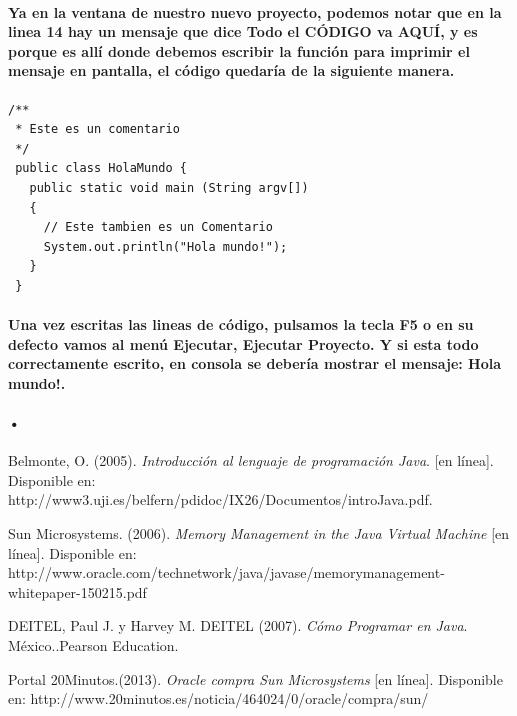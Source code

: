 \documentclass[12pt]{book} %
\begin{document}
\paragraph{Ya en la ventana de nuestro nuevo proyecto, podemos notar que en la linea 14 hay un mensaje que dice Todo el CÓDIGO va AQUÍ, y es porque es allí donde debemos escribir la función para imprimir el mensaje en pantalla, el código quedaría de la siguiente manera.}

\noindent
\noindent
%
\begin{lstlisting}[frame=single]
/**
 * Este es un comentario
 */
 public class HolaMundo {
   public static void main (String argv[])
   {
     // Este tambien es un Comentario
     System.out.println("Hola mundo!");
   }
 }
\end{lstlisting}

\paragraph{Una vez escritas las lineas de código, pulsamos la tecla F5 o en su defecto vamos al menú Ejecutar, Ejecutar Proyecto. Y si esta todo correctamente escrito, en consola se debería mostrar el mensaje: Hola mundo!.}
\paragraph{•}

\begin{thebibliography}{99}
 Belmonte, O. (2005). \textsl{Introducci\'on al lenguaje de programaci\'on Java}. [en l\'inea]. Disponible en: http://www3.uji.es/belfern/pdidoc/IX26/Documentos/introJava.pdf.

 Sun Microsystems. (2006). \textsl{Memory Management in the Java Virtual Machine} [en l\'inea]. Disponible en: http://www.oracle.com/technetwork/java/javase/memorymanagement-whitepaper-150215.pdf

\bibitem DEITEL, Paul J. y Harvey M. DEITEL (2007). \textsl{C\'omo Programar en Java}. M\'exico..Pearson Education. 

\bibitem Portal 20Minutos.(2013). \textsl{Oracle compra Sun Microsystems} [en l\'inea]. Disponible en: http://www.20minutos.es/noticia/464024/0/oracle/compra/sun/

\end{thebibliography}
\end{document}
